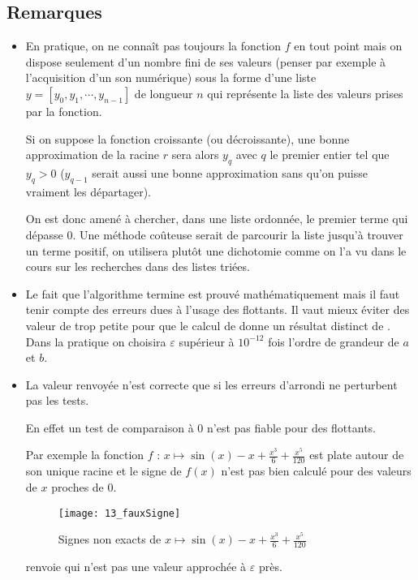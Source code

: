 \subsection{Remarques}
\begin{itemize}
  \item En pratique, on ne connaît pas toujours la fonction $f$ en tout point mais on dispose seulement d'un nombre fini de ses valeurs (penser par exemple à l'acquisition d'un son numérique) sous la forme d'une liste $y=[y_0,y_1,\cdots ,y_{n-1}]$ de longueur $n$ qui représente la liste des valeurs prises par la fonction.
  
  Si on suppose la fonction croissante (ou décroissante), une bonne approximation de la racine $r$ sera alors $y_q$ avec $q$ le premier entier tel que $y_q>0$
($y_{q-1}$ serait aussi une bonne approximation sans qu'on puisse vraiment les départager).

On est donc amené à chercher, dans une liste ordonnée, le premier terme qui dépasse $0$. Une méthode coûteuse serait de parcourir la liste jusqu'à trouver un terme positif, on  utilisera plutôt une dichotomie comme on l'a vu dans le cours sur les recherches dans des listes triées.
\item Le fait que l'algorithme termine est prouvé mathématiquement mais il faut tenir compte des erreurs dues à l'usage des flottants. Il vaut mieux éviter des valeur de  trop petite pour que le calcul de  donne un résultat distinct de . Dans la pratique on choisira $\varepsilon$ supérieur à $10^{-12}$ fois l'ordre de grandeur de $a$ et $b$.
\item La valeur renvoyée n'est correcte que si les erreurs d'arrondi ne perturbent pas les tests.

En effet un test de comparaison à 0 n'est pas fiable pour des flottants.

Par exemple la fonction $f$ : $\displaystyle x \mapsto \sin(x) - x + \frac{x^3}{6} + \frac{x^5}{120}$ est plate autour de son unique racine et le signe de $f(x)$ n'est pas bien calculé pour des valeurs de $x$ proches de 0.
\begin{figure}[ht]
  \begin{center}
      \texttt{[image: 13\_fauxSigne]}
      \caption{\label{grf:fauxSigne} Signes non exacts de $x\mapsto \sin(x) - x + \frac{x^3}{6} + \frac{x^5}{120}$}
  \end{center}
\end{figure}

 renvoie  qui n'est pas une valeur approchée à $\varepsilon$ près.
\end{itemize}

